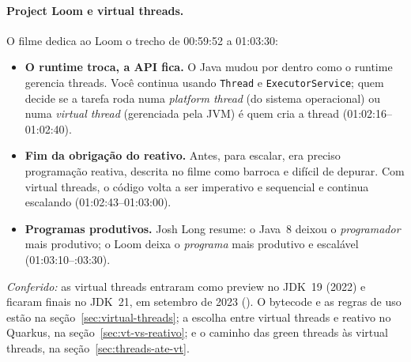 \paragraph{Project Loom e virtual threads.}
O filme dedica ao Loom o trecho de 00:59:52 a 01:03:30:
\begin{itemize}
\item \textbf{O runtime troca, a API fica.} O Java mudou por dentro como o
  runtime gerencia threads. Você continua usando \texttt{Thread} e
  \texttt{ExecutorService}; quem decide se a tarefa roda numa
  \emph{platform thread} (do sistema operacional) ou numa \emph{virtual
  thread} (gerenciada pela JVM) é quem cria a thread (01:02:16--01:02:40).
\item \textbf{Fim da obrigação do reativo.} Antes, para escalar, era
  preciso programação reativa, descrita no filme como barroca e difícil
  de depurar. Com virtual threads, o código volta a ser imperativo e
  sequencial e continua escalando (01:02:43--01:03:00).
\item \textbf{Programas produtivos.} Josh Long resume: o Java~8 deixou o
  \emph{programador} mais produtivo; o Loom deixa o \emph{programa} mais
  produtivo e escalável (01:03:10--:03:30).
\end{itemize}
\emph{Conferido:} as virtual threads entraram como preview no JDK~19
(2022) e ficaram finais no JDK~21, em setembro de 2023
(). O bytecode e as regras de uso estão na
seção~\ref{sec:virtual-threads}; a escolha entre virtual threads e reativo
no Quarkus, na seção~\ref{sec:vt-vs-reativo}; e o caminho das green
threads às virtual threads, na seção~\ref{sec:threads-ate-vt}.
